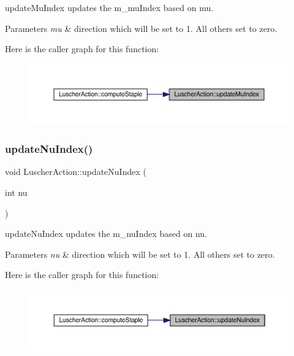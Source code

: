 update\+Mu\+Index updates the m\+\_\+mu\+Index based on mu. 


\begin{DoxyParams}{Parameters}
{\em mu} & direction which will be set to 1. All others set to zero. \\
\hline
\end{DoxyParams}
Here is the caller graph for this function\+:
\nopagebreak
\begin{figure}[H]
\begin{center}
\leavevmode
\includegraphics[width=350pt]{class_luscher_action_a2bfa5f9b8bfb0c4440732000d2281519_icgraph}
\end{center}
\end{figure}
\mbox{\label{class_luscher_action_a6496c97ed38401c0d94855bf940fd6ff}} 
\subsubsection{\texorpdfstring{updateNuIndex()}{updateNuIndex()}}
{\footnotesize\ttfamily void Luscher\+Action\+::update\+Nu\+Index (\begin{DoxyParamCaption}\item[{int}]{nu }\end{DoxyParamCaption})\hspace{0.3cm}{\ttfamily [inline]}}



update\+Nu\+Index updates the m\+\_\+nu\+Index based on nu. 


\begin{DoxyParams}{Parameters}
{\em nu} & direction which will be set to 1. All others set to zero. \\
\hline
\end{DoxyParams}
Here is the caller graph for this function\+:
\nopagebreak
\begin{figure}[H]
\begin{center}
\leavevmode
\includegraphics[width=350pt]{class_luscher_action_a6496c97ed38401c0d94855bf940fd6ff_icgraph}
\end{center}
\end{figure}


